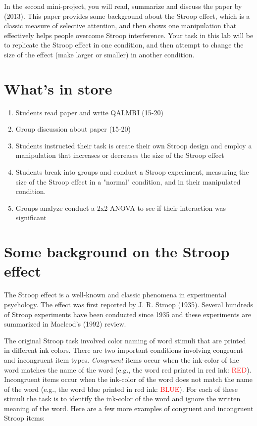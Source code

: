 

In the second mini-project, you will read, summarize and discuss the paper by \citeauthor{raz_suggestion_2006} (2013)\cite{raz_suggestion_2006}. This paper provides some background about the Stroop effect, which is a classic measure of selective attention, and then shows one manipulation that effectively helps people overcome Stroop interference. Your task in this lab will be to replicate the Stroop effect in one condition, and then attempt to change the size of the effect (make larger or smaller) in another condition.

\section{What's in store}

\begin{enumerate}
\item Students read paper and write QALMRI (15-20)
\item	Group discussion about paper (15-20)
\item	Students instructed their task is create their own Stroop design and employ a manipulation that increases or decreases the size of the Stroop effect
\item	Students break into groups and conduct a Stroop experiment, measuring the size of the Stroop effect in a "normal" condition, and in their manipulated condition.
\item	Groups analyze conduct a 2x2 ANOVA to see if their interaction was significant
\end{enumerate}

\section{Some background on the Stroop effect}

The Stroop effect is a well-known and classic phenomena in experimental psychology. The effect was first reported by J. R. Stroop (1935). Several hundreds of Stroop experiments have been conducted since 1935 and these experiments are summarized in Macleod's (1992) review.\cite{Stroop1935,macleod_half_1991}

The original Stroop task involved color naming of word stimuli that are printed in different ink colors. There are two important conditions involving congruent and incongruent item types. \emph{Congruent} items occur when the ink-color of the word matches the name of the word (e.g., the word red printed in red ink: \textcolor{red}{RED}). Incongruent items occur when the ink-color of the word does not match the name of the word (e.g., the word blue printed in red ink: \textcolor{red}{BLUE}). For each of these stimuli the task is to identify the ink-color of the word and ignore the written meaning of the word. Here are a few more examples of congruent and incongruent Stroop items:

